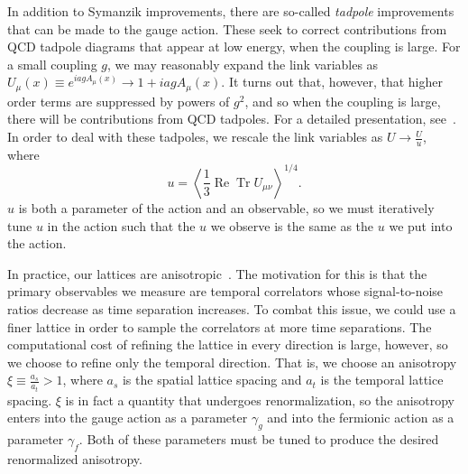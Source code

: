 In addition to Symanzik improvements, there are so-called \emph{tadpole} improvements~\cite{Lepage:1992xa} that can be made to the gauge action. These seek to correct contributions from QCD tadpole diagrams that appear at low energy, when the coupling is large. For a small coupling $g$, we may reasonably expand the link variables as $U_{\mu}(x) \equiv e^{i a g A_{\mu}(x)} \rightarrow 1+i a g A_{\mu}(x)$. It turns out that, however, that higher order terms are suppressed by powers of $g^2$, and so when the coupling is large, there will be contributions from QCD tadpoles. For a detailed presentation, see~\cite{Lepage:1992xa}. In order to deal with these tadpoles, we rescale the link variables as $U \rightarrow \frac{U}{u}$, where
\begin{equation}
    u=\left\langle\frac{1}{3} \operatorname{Re} \operatorname{Tr} U_{\mu \nu}\right\rangle^{1 / 4}.
\end{equation}
$u$ is both a parameter of the action and an observable, so we must iteratively tune $u$ in the action such that the $u$ we observe is the same as the $u$ we put into the action.

In practice, our lattices are anisotropic~\cite{Edwards:2008ja, Lin:2008pr}. The motivation for this is that the primary observables we measure are temporal correlators whose signal-to-noise ratios decrease as time separation increases. To combat this issue, we could use a finer lattice in order to sample the correlators at more time separations. The computational cost of refining the lattice in every direction is large, however, so we choose to refine only the temporal direction. That is, we choose an anisotropy $\xi \equiv \frac{a_s}{a_t} > 1$, where $a_s$ is the spatial lattice spacing and $a_t$ is the temporal lattice spacing. $\xi$ is in fact a quantity that undergoes renormalization, so the anisotropy enters into the gauge action as a parameter $\gamma_g$ and into the fermionic action as a parameter $\gamma_f$. Both of these parameters must be tuned to produce the desired renormalized anisotropy.


